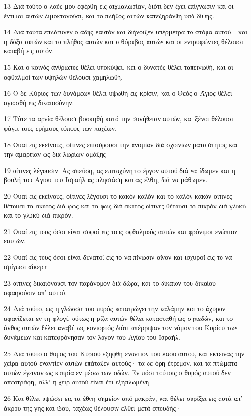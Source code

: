\par 13 Διά τούτο ο λαός μου εφέρθη εις αιχμαλωσίαν, διότι δεν έχει επίγνωσιν και οι έντιμοι αυτών λιμοκτονούσι, και το πλήθος αυτών κατεξηράνθη υπό δίψης.
\par 14 Διά ταύτα επλάτυνεν ο άδης εαυτόν και διήνοιξεν υπέρμετρα το στόμα αυτού· και η δόξα αυτών και το πλήθος αυτών και ο θόρυβος αυτών και οι εντρυφώντες θέλουσι καταβή εις αυτόν.
\par 15 Και ο κοινός άνθρωπος θέλει υποκύψει, και ο δυνατός θέλει ταπεινωθή, και οι οφθαλμοί των υψηλών θέλουσι χαμηλωθή.
\par 16 Ο δε Κύριος των δυνάμεων θέλει υψωθή εις κρίσιν, και ο Θεός ο Άγιος θέλει αγιασθή εις δικαιοσύνην.
\par 17 Τότε τα αρνία θέλουσι βοσκηθή κατά την συνήθειαν αυτών, και ξένοι θέλουσι φάγει τους ερήμους τόπους των παχέων.
\par 18 Ουαί εις εκείνους, οίτινες επισύρουσι την ανομίαν διά σχοινίων ματαιότητος και την αμαρτίαν ως διά λωρίων αμάξης
\par 19 οίτινες λέγουσιν, Ας σπεύση, ας επιταχύνη το έργον αυτού διά να ίδωμεν και η βουλή του Αγίου του Ισραήλ ας πλησιάση και ας έλθη, διά να μάθωμεν.
\par 20 Ουαί εις εκείνους, οίτινες λέγουσι το κακόν καλόν και το καλόν κακόν οίτινες θέτουσι το σκότος διά φως και το φως διά σκότος οίτινες θέτουσι το πικρόν διά γλυκύ και το γλυκύ διά πικρόν.
\par 21 Ουαί εις τους όσοι είναι σοφοί εις τους οφθαλμούς αυτών και φρόνιμοι ενώπιον εαυτών.
\par 22 Ουαί εις τους όσοι είναι δυνατοί εις το να πίνωσιν οίνον και ισχυροί εις το να σμίγωσι σίκερα
\par 23 οίτινες δικαιόνουσι τον παράνομον διά δώρα, και το δίκαιον του δικαίου αφαιρούσιν απ' αυτού.
\par 24 Διά τούτο, ως η γλώσσα του πυρός κατατρώγει την καλάμην και το άχυρον αφανίζεται εν τη φλογί, ούτως η ρίζα αυτών θέλει κατασταθή ως σηπεδών, και το άνθος αυτών θέλει αναβή ως κονιορτός διότι απέρριψαν τον νόμον του Κυρίου των δυνάμεων και κατεφρόνησαν τον λόγον του Αγίου του Ισραήλ.
\par 25 Διά τούτο ο θυμός του Κυρίου εξήφθη εναντίον του λαού αυτού, και εκτείνας την χείρα αυτού εναντίον αυτών επάταξεν αυτούς· τα δε όρη έτρεμον, και τα πτώματα αυτών έγειναν ως κοπρία εν μέσω των οδών. Εν πάσι τούτοις ο θυμός αυτού δεν απεστράφη, αλλ' η χειρ αυτού είναι έτι εξηπλωμένη.
\par 26 Και θέλει υψώσει εις τα έθνη σημείον από μακράν, και θέλει συρίξει εις αυτά απ' άκρου της γης και ιδού, ταχέως θέλουσιν ελθεί μετά σπουδής·
